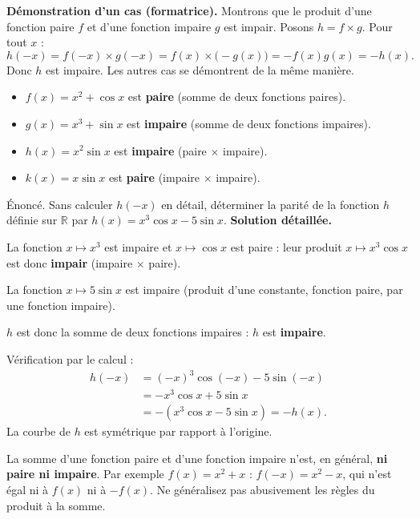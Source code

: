 \documentclass[11pt]{article}
\begin{document}
\textbf{Démonstration d'un cas (formatrice).} Montrons que le produit d'une fonction paire $f$ et d'une fonction impaire $g$ est impair. Posons $h=f\times g$. Pour tout $x$ :
\[ h(-x)=f(-x)\times g(-x)=f(x)\times\bigl(-g(x)\bigr)=-f(x)g(x)=-h(x). \]
Donc $h$ est impaire. Les autres cas se démontrent de la même manière.

\begin{exemplebox}
\begin{itemize}
\item $f(x)=x^2+\cos x$ est \textbf{paire} (somme de deux fonctions paires).
\item $g(x)=x^3+\sin x$ est \textbf{impaire} (somme de deux fonctions impaires).
\item $h(x)=x^2\sin x$ est \textbf{impaire} (paire $\times$ impaire).
\item $k(x)=x\sin x$ est \textbf{paire} (impaire $\times$ impaire).
\end{itemize}
\end{exemplebox}

\begin{exoresolu}
Énoncé. Sans calculer $h(-x)$ en détail, déterminer la parité de la fonction $h$ définie sur $\mathbb{R}$ par $h(x)=x^3\cos x - 5\sin x$.
\tcblower
\textbf{Solution détaillée.}

La fonction $x\mapsto x^3$ est impaire et $x\mapsto\cos x$ est paire : leur produit $x\mapsto x^3\cos x$ est donc \textbf{impair} (impaire $\times$ paire).

La fonction $x\mapsto 5\sin x$ est impaire (produit d'une constante, fonction paire, par une fonction impaire).

$h$ est donc la somme de deux fonctions impaires : $h$ est \textbf{impaire}.

Vérification par le calcul :
\begin{align*}
h(-x) &= (-x)^3\cos(-x)-5\sin(-x) \\
&= -x^3\cos x +5\sin x \\
&= -(x^3\cos x - 5\sin x) = -h(x).
\end{align*}
La courbe de $h$ est symétrique par rapport à l'origine.
\end{exoresolu}

\begin{attention}
La somme d'une fonction paire et d'une fonction impaire n'est, en général, \textbf{ni paire ni impaire}. Par exemple $f(x)=x^2+x$ : $f(-x)=x^2-x$, qui n'est égal ni à $f(x)$ ni à $-f(x)$. Ne généralisez pas abusivement les règles du produit à la somme.
\end{attention}
\end{document}
